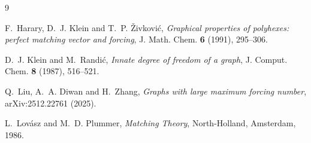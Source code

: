 \documentclass[11pt]{amsart}
\theoremstyle{remark}
\begin{document}
\begin{thebibliography}{9}

F.~Harary, D.~J. Klein and T.~P. \v{Z}ivkovi\'c,
\emph{Graphical properties of polyhexes: perfect matching vector and forcing},
J. Math. Chem. \textbf{6} (1991), 295--306.

D.~J. Klein and M.~Randi\'c,
\emph{Innate degree of freedom of a graph},
J. Comput. Chem. \textbf{8} (1987), 516--521.

Q.~Liu, A.~A. Diwan and H.~Zhang,
\emph{Graphs with large maximum forcing number},
arXiv:2512.22761 (2025).

L.~Lov\'asz and M.~D. Plummer,
\emph{Matching Theory},
North-Holland, Amsterdam, 1986.

\end{thebibliography}
\end{document}
